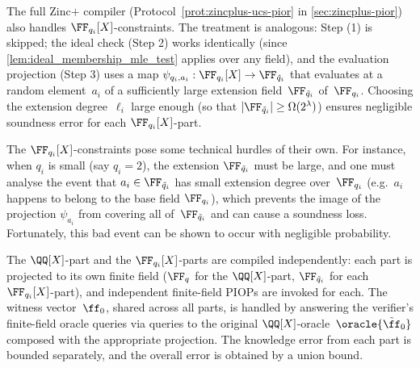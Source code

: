 \begin{remark}\label{rem:fq_adaptation_overview}
The full Zinc$+$ compiler (Protocol~\ref{prot:zincplus-ucs-pior} in \cref{sec:zincplus-pior}) also handles $\FF_{q_i}[X]$-constraints. The treatment is analogous: Step (1) is skipped; the ideal check (Step 2) works identically (since \cref{lem:ideal_membership_mle_test} applies over any field), and the evaluation projection (Step 3) uses a map $\psi_{q_i,a_i}:\FF_{q_i}[X] \to \FF_{\tilde q_i}$ that evaluates at a random element~$a_i$ of a sufficiently large extension field~$\FF_{\tilde q_i}$ of~$\FF_{q_i}$. Choosing the extension degree~$\ell_i$ large enough (so that $|\FF_{\tilde q_i}|\geq \Omega(2^\lambda)$) ensures negligible soundness error for each $\FF_{q_i}[X]$-part. 


The $\FF_{q_i}[X]$-constraints pose some technical hurdles of their own. For instance, when $q_i$ is small (say $q_i=2$), the extension $\FF_{\tilde{q}_i}$ must be large, and one must analyse the event that $a_i\in \FF_{\tilde q_i}$ has small extension degree over~$\FF_{q_i}$ (e.g.\ $a_i$ happens to belong to the base field $\FF_{q_i}$), which prevents the image of the projection  $\psi_{a_i}$ from covering all of~$\FF_{\tilde q_i}$ and can cause a soundness loss. Fortunately, this bad event can be shown to occur with negligible probability.

The $\QQ[X]$-part and the $\FF_{q_i}[X]$-parts are compiled independently: each part is projected to its own finite field ($\FF_q$ for the $\QQ[X]$-part, $\FF_{\tilde q_i}$ for each $\FF_{q_i}[X]$-part), and independent finite-field PIOPs are invoked for each. The witness vector~$\ff_0$, shared across all parts, is handled by answering the verifier's finite-field oracle queries via queries to the original $\QQ[X]$-oracle~$\oracle{\tilde \ff_0}$ composed with the appropriate projection. The knowledge error from each part is bounded separately, and the overall error is obtained by a union bound. 

\end{remark}



